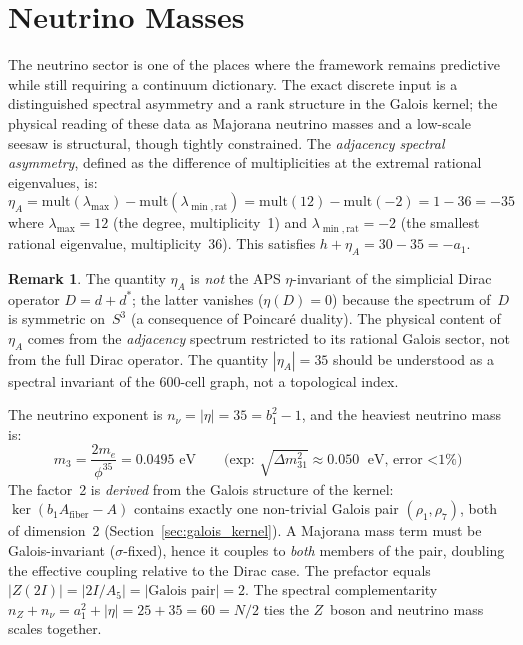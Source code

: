 \documentclass[12pt,a4paper]{article}
\theoremstyle{definition}
\newtheorem{remark}{Remark}
\begin{document}

\section{Neutrino Masses}
\label{sec:neutrinos}

The neutrino sector is one of the places where the framework remains predictive while still requiring a continuum dictionary.  The exact discrete input is a distinguished spectral asymmetry and a rank structure in the Galois kernel; the physical reading of these data as Majorana neutrino masses and a low-scale seesaw is structural, though tightly constrained.  The \emph{adjacency spectral asymmetry}, defined as the difference of multiplicities at the extremal rational eigenvalues, is:
\begin{equation}
\eta_A = \text{mult}(\lambda_{\max}) - \text{mult}(\lambda_{\min,\text{rat}}) = \text{mult}(12) - \text{mult}(-2) = 1 - 36 = -35
\end{equation}
where $\lambda_{\max} = 12$ (the degree, multiplicity~1) and $\lambda_{\min,\text{rat}} = -2$ (the smallest rational eigenvalue, multiplicity~36).  This satisfies $h + \eta_A = 30 - 35 = -a_1$.

\begin{remark}
The quantity $\eta_A$ is \emph{not} the APS $\eta$-invariant of the simplicial Dirac operator $D = d + d^*$; the latter vanishes ($\eta(D) = 0$) because the spectrum of~$D$ is symmetric on~$S^3$ (a consequence of Poincar\'e duality).  The physical content of~$\eta_A$ comes from the \emph{adjacency} spectrum restricted to its rational Galois sector, not from the full Dirac operator.  The quantity $|\eta_A| = 35$ should be understood as a spectral invariant of the 600-cell graph, not a topological index.
\end{remark}

The neutrino exponent is $n_\nu = |\eta| = 35 = b_1^2 - 1$, and the heaviest neutrino mass is:
\begin{equation}
\boxed{m_3 = \frac{2m_e}{\phi^{35}} = 0.0495 \text{ eV}} \qquad \text{(exp: } \sqrt{\Delta m^2_{31}} \approx 0.050 \text{ eV, error $<$1\%)}
\end{equation}
The factor~2 is \emph{derived} from the Galois structure of the kernel: $\ker(b_1 A_{\text{fiber}} - A)$ contains exactly one non-trivial Galois pair $(\rho_1, \rho_7)$, both of dimension~2 (Section~\ref{sec:galois_kernel}).  A Majorana mass term must be Galois-invariant ($\sigma$-fixed), hence it couples to \emph{both} members of the pair, doubling the effective coupling relative to the Dirac case.  The prefactor equals $|Z(2I)| = |2I/A_5| = |\text{Galois pair}| = 2$.  The spectral complementarity $n_Z + n_\nu = a_1^2 + |\eta| = 25 + 35 = 60 = N/2$ ties the $Z$~boson and neutrino mass scales together.
\end{document}
